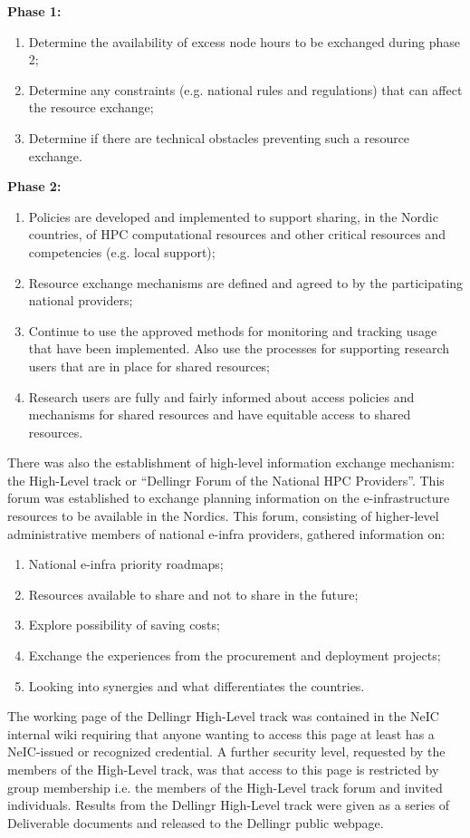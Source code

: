 \documentclass{article}
\newcommand{\dell}{Dellingr\xspace}
\newcommand{\einfra}{e-infrastructure\xspace}
\newcommand{\HLT}{High-Level track\xspace}
\begin{document}
{\bf Phase 1:}
\begin{enumerate}
\item Determine the availability of excess node hours to be exchanged during phase 2;
\item Determine any constraints (e.g. national rules and regulations) that can affect the resource exchange;
\item Determine if there are technical obstacles preventing such a resource exchange.
\end{enumerate}

{\bf Phase 2:}
\begin{enumerate}
\item Policies are developed and implemented to support sharing, in the Nordic countries, of HPC computational resources and other critical resources and competencies (e.g. local support);
\item Resource exchange mechanisms are defined and agreed to by the participating national providers;
\item Continue to use the approved methods for monitoring and tracking usage that have been implemented. Also use the processes for supporting research users that are in place for shared resources;
\item Research users are fully and fairly informed about access policies and mechanisms for shared resources and have equitable 
access to shared resources.
\end{enumerate}

There was also the establishment of high-level information exchange mechanism: the \HLT or ``\dell Forum of the National HPC Providers''.
This forum was established to exchange planning information on the \einfra resources to be available in the Nordics.
This forum, consisting of higher-level administrative members of national e-infra providers, gathered information on:
\begin{enumerate}
\item National e-infra priority roadmaps;
\item Resources available to share and not to share in the future;
\item Explore possibility of saving costs;
\item Exchange the experiences from the procurement and deployment projects;
\item Looking into synergies and what differentiates the countries.
\end{enumerate}
The working page of the \dell \HLT was contained in the NeIC internal wiki requiring that anyone wanting to access this page at least
has a NeIC-issued or recognized credential.
A further security level, requested by the members of the \HLT, was that access to this page is restricted by group membership i.e.
the members of the \HLT forum and invited individuals.
Results from the \dell \HLT were given as a series of Deliverable documents and released to the \dell public webpage.
\end{document}
